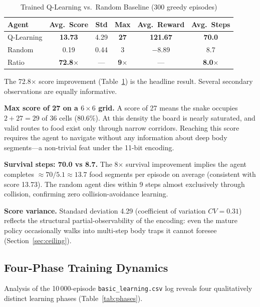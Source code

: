 \documentclass[10pt,conference]{IEEEtran}
\begin{document}
\begin{table}[h]
  \centering
  \caption{Trained Q-Learning vs.\ Random Baseline (300 greedy episodes)}
  \label{tab:primary}
  \begin{tabular}{lccccc}
    \toprule
    Agent & Avg.\ Score & Std & Max & Avg.\ Reward & Avg.\ Steps\\
    \midrule
    Q-Learning & \textbf{13.73} & 4.29 & \textbf{27} & \textbf{121.67} & \textbf{70.0}\\
    Random     & 0.19           & 0.44 &  3  & $-$8.89  & 8.7\\
    Ratio      & \textbf{72.8$\times$} & --- & \textbf{9$\times$} & ---
               & \textbf{8.0$\times$}\\
    \bottomrule
  \end{tabular}
\end{table}

The 72.8$\times$ score improvement (Table~\ref{tab:primary}) is the
headline result. Several secondary observations are equally
informative.

\textbf{Max score of 27 on a $6{\times}6$ grid.}
A score of 27 means the snake occupies $2+27=29$ of 36 cells
(80.6\%).
At this density the board is nearly saturated, and valid routes to
food exist only through narrow corridors.
Reaching this score requires the agent to navigate without any
information about deep body segments---a non-trivial feat under the
11-bit encoding.

\textbf{Survival steps: 70.0 vs 8.7.}
The 8$\times$ survival improvement implies the agent completes
$\approx70/5.1\approx13.7$ food segments per episode on average
(consistent with score 13.73).
The random agent dies within 9 steps almost exclusively through
collision, confirming zero collision-avoidance learning.

\textbf{Score variance.}
Standard deviation 4.29 (coefficient of variation $CV=0.31$) reflects
the structural partial-observability of the encoding: even the mature
policy occasionally walks into multi-step body traps it cannot
foresee (Section~\ref{sec:ceiling}).

\subsection{Four-Phase Training Dynamics}
\label{sec:phases}

Analysis of the 10\,000-episode \texttt{basic\_learning.csv} log
reveals four qualitatively distinct learning phases
(Table~\ref{tab:phases}).
\end{document}
